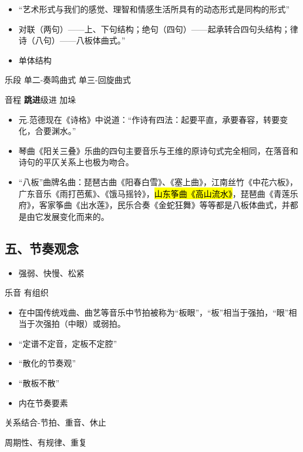 \documentclass[
]{article}
\providecommand{\tightlist}{%
  \setlength{\itemsep}{0pt}\setlength{\parskip}{0pt}}
\begin{document}
\begin{itemize}
\tightlist
\item
  ``艺术形式与我们的感觉、理智和情感生活所具有的动态形式是同构的形式''
\item
  对联（两句）------上、下句结构；绝句（四句）------起承转合四句头结构；律诗（八句）------八板体曲式。''
\item
  单体结构
\end{itemize}

乐段 单二-奏鸣曲式 单三-回旋曲式

音程 \textbf{跳进}级进 加垛

\begin{itemize}
\tightlist
\item
  元.范德现在《诗格》中说道：``作诗有四法：起要平直，承要春容，转要变化，合要渊水。''
\item
  琴曲《阳关三叠》乐曲的四句主要音乐与王维的原诗句式完全相同，在落音和诗句的平仄关系上也极为吻合。
\item
  ``八板''曲牌名曲：琵琶古曲《阳春白雪》、《塞上曲》，江南丝竹《中花六板》，广东音乐《雨打芭蕉》、《饿马摇铃》，\hl{\mbox{山东筝曲《高山流水》}}，琵琶曲《青莲乐府》，客家筝曲《出水莲》，民乐合奏《金蛇狂舞》等等都是八板体曲式，并都是由它发展变化而来的。
\end{itemize}

\subsection{五、节奏观念}\label{ux4e94ux8282ux594fux89c2ux5ff5}

\begin{itemize}
\tightlist
\item
  强弱、快慢、松紧
\end{itemize}

乐音 有组织

\begin{itemize}
\tightlist
\item
  在中国传统戏曲、曲艺等音乐中节拍被称为``板眼''，``板''相当于强拍，``眼''相当于次强拍（中眼）或弱拍。
\item
  ``定谱不定音，定板不定腔''
\item
  ``散化的节奏观''
\item
  ``散板不散''
\item
  内在节奏要素
\end{itemize}

关系结合-节拍、重音、休止

周期性、有规律、重复
\end{document}
